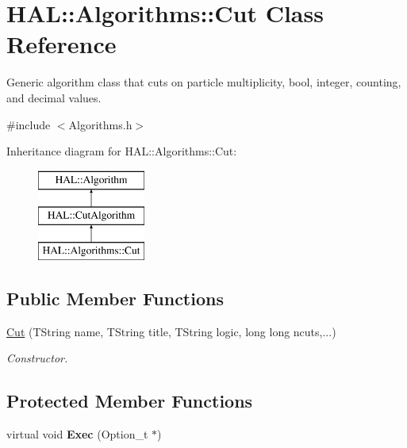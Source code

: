 \hypertarget{class_h_a_l_1_1_algorithms_1_1_cut}{\section{H\+A\+L\+:\+:Algorithms\+:\+:Cut Class Reference}
\label{class_h_a_l_1_1_algorithms_1_1_cut}
}


Generic algorithm class that cuts on particle multiplicity, bool, integer, counting, and decimal values.  




{\ttfamily \#include $<$Algorithms.\+h$>$}

Inheritance diagram for H\+A\+L\+:\+:Algorithms\+:\+:Cut\+:\begin{figure}[H]
\begin{center}
\leavevmode
\includegraphics[height=3.000000cm]{class_h_a_l_1_1_algorithms_1_1_cut}
\end{center}
\end{figure}
\subsection*{Public Member Functions}
\begin{DoxyCompactItemize}
\item 
\hyperlink{class_h_a_l_1_1_algorithms_1_1_cut_a91f1ee2770d1a90d503cd1b6300dbce2}{Cut} (T\+String name, T\+String title, T\+String logic, long long ncuts,...)
\begin{DoxyCompactList}\small\item\em Constructor. \end{DoxyCompactList}\end{DoxyCompactItemize}
\subsection*{Protected Member Functions}
\begin{DoxyCompactItemize}
\item 
\hypertarget{class_h_a_l_1_1_algorithms_1_1_cut_aa1257616a4912852aa4ce2eb849e2ead}{virtual void {\bfseries Exec} (Option\+\_\+t $\ast$)}\label{class_h_a_l_1_1_algorithms_1_1_cut_aa1257616a4912852aa4ce2eb849e2ead}

\end{DoxyCompactItemize}
